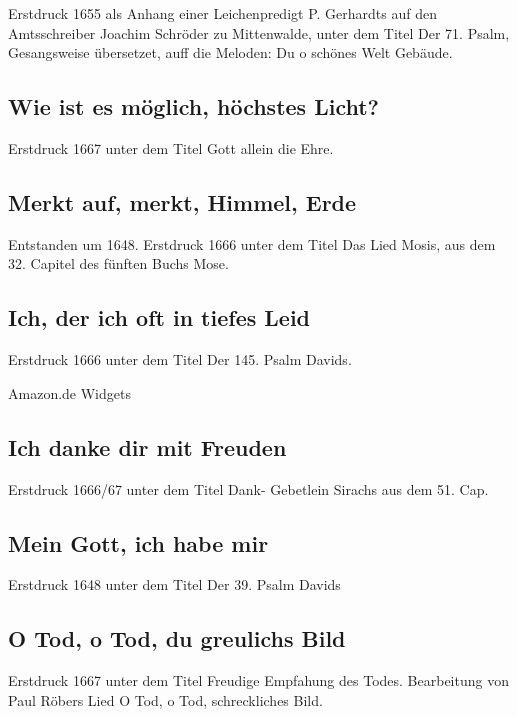 Erstdruck 1655 als Anhang einer Leichenpredigt P. Gerhardts auf den
Amtsschreiber Joachim Schröder zu Mittenwalde, unter dem Titel \frqq Der 71.
Psalm, Gesangsweise übersetzet, auff die Meloden: Du o schönes Welt
Gebäude\flqq .

\subsection*{ Wie ist es möglich, höchstes Licht?}

Erstdruck 1667 unter dem Titel \frqq Gott allein die Ehre\flqq .

\subsection*{ Merkt auf, merkt, Himmel, Erde}

Entstanden um 1648. Erstdruck 1666 unter dem Titel \frqq Das Lied Mosis, aus
dem 32. Capitel des fünften Buchs Mose\flqq .

\subsection*{ Ich, der ich oft in tiefes Leid}

Erstdruck 1666 unter dem Titel \frqq Der 145. Psalm Davids\flqq .

Amazon.de Widgets 

\subsection*{ Ich danke dir mit Freuden}

Erstdruck 1666/67 unter dem Titel \frqq Dank- Gebetlein Sirachs aus dem 51.
Cap.\flqq 

\subsection*{ Mein Gott, ich habe mir}

Erstdruck 1648 unter dem Titel \frqq Der 39. Psalm Davids\flqq 

\subsection*{ O Tod, o Tod, du greulichs Bild}

Erstdruck 1667 unter dem Titel \frqq Freudige Empfahung des Todes\flqq .
Bearbeitung von Paul Röbers Lied \frqq O Tod, o Tod, schreckliches Bild\flqq .

